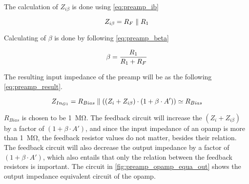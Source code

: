 \newpage

The calculation of $Z_{i\beta}$ is done using \autoref{eq:preamp_ib}

\begin{equation}\label{eq:preamp_ib}
        Z_{i\beta} = R_F\parallel R_1
        \addunit{\si{\ohm}}
    \end{equation}

    \startexplain
    \stopexplain

Calculating of $\beta$ is done by following \autoref{eq:preamp_beta}

\begin{equation}\label{eq:preamp_beta}
        \beta = \frac{R_1}{R_1 + R_F}
        \addunit{\si{1}}
    \end{equation}
    \startexplain
    \stopexplain


The resulting input impedance of the \gls{preamp} will be as the following \autoref{eq:preamp_result}.

\begin{equation}\label{eq:preamp_result}
        Z_{In_{G1}} = R_{Bias}\parallel ((Z_i + Z_{i \beta}) \cdot (1+\beta \cdot A')) \simeq R_{Bias}
        \addunit{\si{\ohm}}
    \end{equation}

    \startexplain
    \stopexplain

$R_{Bias}$ is chosen to be \SI{1}{\mega\ohm}.
The feedback circuit will increase the $(Z_{i}+Z_{i\beta})$ by a factor of $(1+\beta \cdot A')$, and since the input impedance of an \gls{opamp} is more than \SI{1}{\mega\ohm}, the feedback resistor values do not matter, besides their relation. The feedback circuit will also decrease the output impedance by a factor of $(1+\beta \cdot A')$, which also entails that only the relation between the feedback resistors is important. The circuit in \autoref{fig:preamp_opamp_equa_out} shows the output impedance equivalent circuit of the \gls{opamp}.

